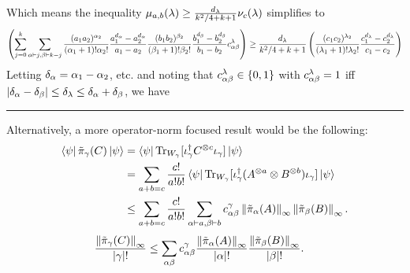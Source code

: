 \documentclass[notitlepage, 10pt]{article}
\begin{document}
    Which means the inequality $\mu_{a,b}(\lambda) \geq \frac{d_{\lambda}}{k^2/4+k+1} \nu_{c}(\lambda)$ simplifies to
    \begin{equation}
        \left(\sum_{j=0}^{k} \sum_{\alpha\vdash j,\beta \vdash k-j} \frac{(a_1a_2)^{\alpha_2}}{(\alpha_1+1)!\alpha_2!} \frac{a_1^{d_\alpha} - a_2^{d_\alpha}}{a_1 - a_2}\frac{ (b_1b_2)^{\beta_2}}{(\beta_1+1)!\beta_2!} \frac{b_1^{d_\beta} - b_2^{d_\beta}}{b_1 - b_2}c^{\lambda}_{\alpha\beta}\right) 
        \geq \frac{d_{\lambda}}{k^2/4+k+1}
        \left(\frac{(c_1c_2)^{\lambda_2}}{(\lambda_1+1)!\lambda_2!}  \frac{c_1^{d_\lambda} - c_2^{d_\lambda}}{c_1 - c_2}\right)
    \end{equation}
    Letting $\delta_\alpha = \alpha_1 - \alpha_2$, etc. and noting that $c^{\lambda}_{\alpha\beta} \in \{0,1\}$ with $c^{\lambda}_{\alpha\beta} = 1$ iff $\left|\delta_{\alpha}-\delta_{\beta}\right| \leq \delta_{\lambda} \leq \delta_{\alpha}+\delta_{\beta}$, we have
\hrule
    Alternatively, a more operator-norm focused result would be the following:
    \begin{align}
        \bra \psi \tilde \pi_{\gamma}(C) \ket \psi 
        &= \bra \psi \operatorname{Tr}_{W_{\gamma}}[\iota^{\dagger}_{\gamma} C^{\otimes c} \iota_{\gamma}] \ket \psi \\
        &= \sum_{a+b=c} \frac{c!}{a!b!} \bra \psi \operatorname{Tr}_{W_{\gamma}}[\iota^{\dagger}_{\gamma} (A^{\otimes a} \otimes B^{\otimes b}) \iota_{\gamma}] \ket \psi \\
        &\leq  \sum_{a+b=c} \frac{c!}{a!b!} \sum_{\alpha\vdash a,\beta\vdash b} c^{\gamma}_{\alpha\beta} \left\lVert\tilde \pi_\alpha(A)\right\rVert_{\infty} \left\lVert\tilde \pi_\beta(B)\right\rVert_{\infty}.
    \end{align}
    \begin{align}
        \frac{\left\lVert\tilde \pi_{\gamma}(C)\right\rVert_{\infty}}{{|\gamma|}!}
        &\leq \sum_{\alpha\beta} c^{\gamma}_{\alpha\beta} \frac{\left\lVert\tilde \pi_\alpha(A)\right\rVert_{\infty}}{{|\alpha|}!} \frac{\left\lVert\tilde \pi_\beta(B)\right\rVert_{\infty}}{{|\beta|}!}.
    \end{align}
\end{document}
